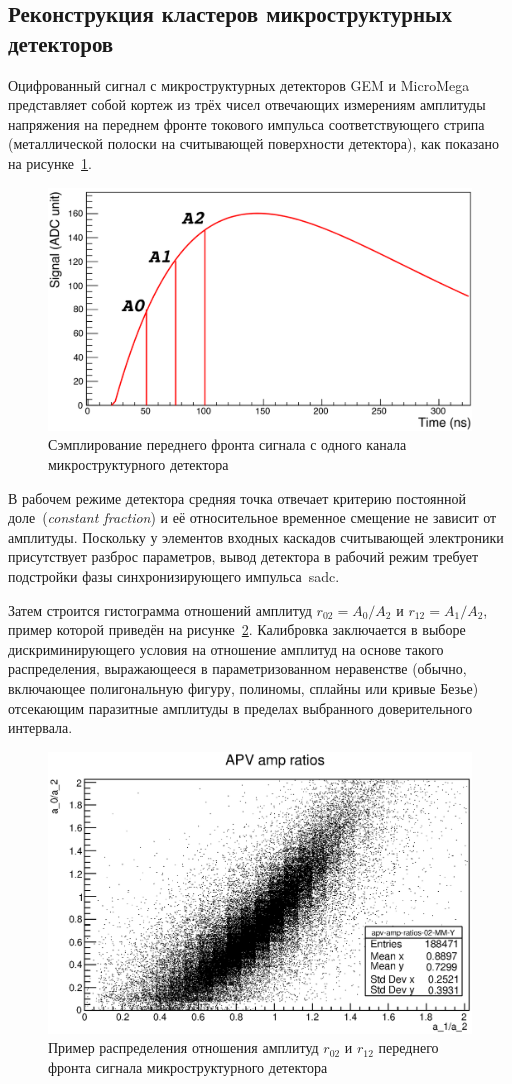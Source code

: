\subsection{Реконструкция кластеров микроструктурных детекторов}

Оцифрованный сигнал с микроструктурных детекторов GEM и MicroMega представляет
собой кортеж из трёх чисел отвечающих измерениям амплитуды напряжения на переднем
фронте токового импульса соответствующего стрипа (металлической полоски на считывающей
поверхности детектора), как показано на рисунке~\ref{fig:apv-pulse-sampling}.

\begin{figure}
    \centering
    \includegraphics[width=0.45\linewidth]{images//illustrative/mm-amps.png}
    \caption{Сэмплирование переднего фронта сигнала с одного канала
    микроструктурного детектора~\cite{na64-BANERJEE201872}}
    \label{fig:apv-pulse-sampling}
\end{figure}

В рабочем режиме детектора средняя точка отвечает критерию постоянной
доле~(\emph{constant fraction}) и её относительное временное смещение не зависит от
амплитуды. Поскольку у элементов входных каскадов считывающей электроники присутствует
разброс параметров, вывод детектора в рабочий режим требует
подстройки фазы синхронизирующего импульса~\acrshort{sadc}.

Затем строится гистограмма отношений амплитуд $r_{02}=A_0/A_2$ и $r_{12}=A_1/A_2$,
пример которой приведён на рисунке~\ref{fig:banana-histogram}. Калибровка 
заключается в выборе дискриминирующего условия на отношение амплитуд на основе такого
распределения, выражающееся в параметризованном неравенстве (обычно, включающее
полигональную фигуру, полиномы, сплайны или кривые Безье) отсекающим паразитные
амплитуды в пределах выбранного доверительного интервала.

\begin{figure}
    \centering
    \includegraphics[width=0.45\linewidth]{images/illustrative/banana-example.eps}
    \caption{Пример распределения отношения амплитуд $r_{02}$ и $r_{12}$ переднего
    фронта сигнала микроструктурного детектора}
    \label{fig:banana-histogram}
\end{figure}

